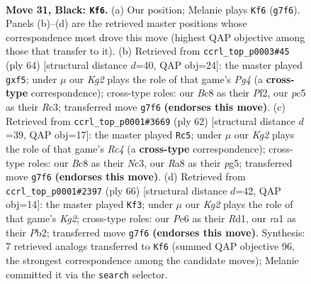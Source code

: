 \documentclass[11pt]{article}
\begin{document}
\clearpage

\begin{figure}[p]\centering
\begin{subfigure}{0.46\textwidth}\centering
\resizebox{\linewidth}{!}{%
\newchessgame
\chessboard[
  setfen={rnb5/p5k1/2p1p1P1/P1PpN3/1P6/2P5/5K2/R1B5 b - - 0 31},
  showmover=false,
  pgfstyle=straightmove, color=movearrow, markmove={g7-f6}
]}
\caption{}
\end{subfigure}\hfill
\begin{subfigure}{0.46\textwidth}\centering
\resizebox{\linewidth}{!}{%
\newchessgame
\chessboard[
  setfen={r5k1/p5p1/2n1p2p/2B2p2/P1N3P1/1PR5/2P2P1b/1K6 w - - 0 33},
  showmover=false,
  pgfstyle=straightmove, color=movearrow, markmove={g4-f5}
]}
\caption{}
\end{subfigure}
\\[4pt]
\begin{subfigure}{0.46\textwidth}\centering
\resizebox{\linewidth}{!}{%
\newchessgame
\chessboard[
  setfen={6k1/p7/2p1r3/6p1/1PR1Ppnp/P1N5/5PP1/6K1 w - - 1 32},
  showmover=false,
  pgfstyle=straightmove, color=movearrow, markmove={c4-c5}
]}
\caption{}
\end{subfigure}\hfill
\begin{subfigure}{0.46\textwidth}\centering
\resizebox{\linewidth}{!}{%
\newchessgame
\chessboard[
  setfen={3r4/1p4k1/p1pnp2p/8/3PPpP1/1P1B3P/1P4K1/3R4 w - - 0 34},
  showmover=false,
  pgfstyle=straightmove, color=movearrow, markmove={g2-f3}
]}
\caption{}
\end{subfigure}
\caption{\textbf{Move 31, Black: \texttt{Kf6}.} (a) Our position; Melanie plays \texttt{Kf6} (\texttt{g7f6}). Panels (b)--(d) are the retrieved master positions whose correspondence most drove this move (highest QAP objective among those that transfer to it). (b) Retrieved from \texttt{ccrl\_top\_p0003\#45} (ply 64) [structural distance $d$=40, QAP obj=24]: the master played \texttt{gxf5}; under $\mu$ our \emph{Kg2} plays the role of that game's \emph{Pg4} (a \textbf{cross-type} correspondence); cross-type roles: our \emph{B}c8 as their \emph{P}f2, our \emph{p}c5 as their \emph{R}c3; transferred move \texttt{g7f6} \textbf{(endorses this move)}. (c) Retrieved from \texttt{ccrl\_top\_p0001\#3669} (ply 62) [structural distance $d$=39, QAP obj=17]: the master played \texttt{Rc5}; under $\mu$ our \emph{Kg2} plays the role of that game's \emph{Rc4} (a \textbf{cross-type} correspondence); cross-type roles: our \emph{B}c8 as their \emph{N}c3, our \emph{R}a8 as their \emph{p}g5; transferred move \texttt{g7f6} \textbf{(endorses this move)}. (d) Retrieved from \texttt{ccrl\_top\_p0001\#2397} (ply 66) [structural distance $d$=42, QAP obj=14]: the master played \texttt{Kf3}; under $\mu$ our \emph{Kg2} plays the role of that game's \emph{Kg2}; cross-type roles: our \emph{P}e6 as their \emph{R}d1, our \emph{r}a1 as their \emph{P}b2; transferred move \texttt{g7f6} \textbf{(endorses this move)}. Synthesis: 7 retrieved analogs transferred to \texttt{Kf6} (summed QAP objective 96, the strongest correspondence among the candidate moves); Melanie committed it via the \texttt{search} selector.}
\label{fig:thought-m61}
\end{figure}
\end{document}
